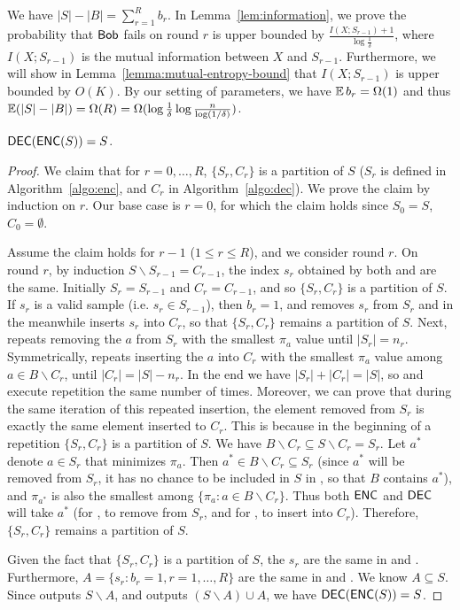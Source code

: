 We have $|S|-|B|=\sum_{r=1}^{R}b_r$. 
In Lemma~\ref{lem:information}, we prove the probability that $\mathsf{Bob}$ fails on round $r$ is upper bounded by $\frac{I(X;S_{r-1})+1}{\log \frac{1}{\delta}}$, where $I(X;S_{r-1})$ is the mutual information between $X$ and $S_{r-1}$. 
Furthermore, we will show in Lemma~\ref{lemma:mutual-entropy-bound} that $I(X;S_{r-1})$ is upper bounded by $O(K)$.
By our setting of parameters, we have $\operatorname*{\mathbb{E}} b_r=\Omega(1)$ and thus $\operatorname*{\mathbb{E}}(|S|-|B|)=\Omega(R)=\Omega(\log \frac{1}{\delta}\log \frac{n}{\log (1/\delta)})$.
 
\begin{lemma}\label{lemma:zero-fail-prob}
  $\textsf{DEC}(\textsf{ENC}(S))=S$.
\end{lemma}
\begin{proof}
  We claim that for $r=0,\ldots, R$, $\{S_r, C_r\}$ is a partition of $S$ ($S_r$ is defined in Algorithm~\ref{algo:enc}, and $C_r$ in Algorithm~\ref{algo:dec}). We prove the claim by induction on $r$. Our base case is $r=0$, for which the claim holds since $S_0 = S$, $C_0 = \emptyset$.
  
  Assume the claim holds for $r-1$ ($1\le r \le R$), and we consider round $r$.  On round $r$, by induction $S\backslash S_{r-1}=C_{r-1}$, the index $s_r$ obtained by both \enc and \dec are the same.  Initially $S_r=S_{r-1}$ and $C_r=C_{r-1}$, and so $\{S_r,C_r\}$ is a partition of $S$.  If $s_r$ is a valid sample (i.e. $s_r\in S_{r-1}$), then $b_r=1$, and \enc removes $s_r$ from $S_r$ and in the meanwhile \dec inserts $s_r$ into $C_r$, so that $\{S_r, C_r\}$ remains a partition of $S$. Next, \enc repeats removing the $a$ from $S_r$ with the smallest $\pi_a$ value until $|S_r|=n_r$. Symmetrically, \dec repeats inserting the $a$ into $C_r$ with the smallest $\pi_a$ value among $a\in B\backslash C_r$, until $|C_r|=|S|-n_r$. In the end we have $|S_r|+|C_r|=|S|$, so \enc and \dec execute repetition the same number of times.  Moreover, we can prove that during the same iteration of this repeated insertion, the element removed from $S_r$ is exactly the same element inserted to $C_r$.  This is because in the beginning of a repetition $\{S_r, C_r\}$ is a partition of $S$.  We have $B\backslash C_r\subseteq S\backslash C_r=S_r$. Let $a^*$ denote $a\in S_r$ that minimizes $\pi_a$.  Then $a^*\in B\backslash C_r\subseteq S_r$ (since $a^*$ will be removed from $S_r$, it has no chance to be included in $S$ in \enc, so that $B$ contains $a^*$), and $\pi_{a^*}$ is also the smallest among $\{\pi_a : a\in B\backslash C_r\}$.  Thus both $\textsf{ENC}$ and $\textsf{DEC}$ will take $a^{*}$ (for \enc, to remove from $S_r$, and for \dec, to insert into $C_r$).  Therefore, $\{S_r, C_r\}$ remains a partition of $S$.
  
  Given the fact that $\{S_r, C_r\}$ is a partition of $S$, the $s_r$ are the same in \enc and \dec.  Furthermore, $A=\{s_r : b_r=1,r=1,\ldots, R\}$ are the same in \enc and \dec.  We know $A\subseteq S$.  Since \enc outputs $S\backslash A$, and \dec outputs $(S\backslash A)\cup A$, we have $\textsf{DEC}(\textsf{ENC}(S))=S$.
\end{proof}

